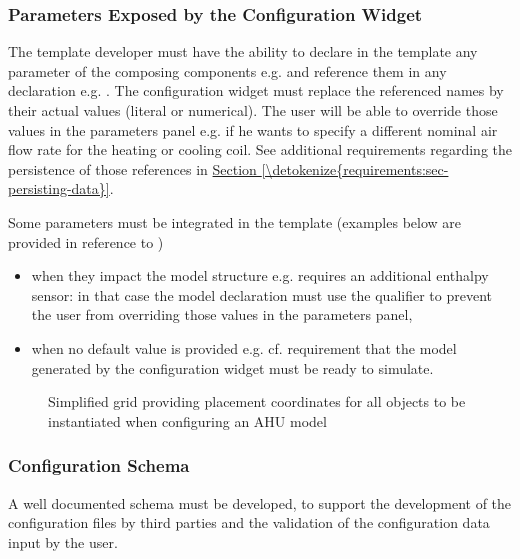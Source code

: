 \documentclass[letterpaper,10pt, openany,english]{sphinxmanual}
\begin{document}
\subsubsection{Parameters Exposed by the Configuration Widget}
\label{\detokenize{requirements:parameters-exposed-by-the-configuration-widget}}
The template developer must have the ability to declare in the template any parameter of the composing components e.g.  and reference them in any declaration e.g. . The configuration widget must replace the referenced names by their actual values (literal or numerical). The user will be able to override those values in the parameters panel e.g. if he wants to specify a different nominal air flow rate for the heating or cooling coil. See additional requirements regarding the persistence of those references in \hyperref[\detokenize{requirements:sec-persisting-data}]{Section \ref{\detokenize{requirements:sec-persisting-data}}}.

Some parameters must be integrated in the template (examples below are provided in reference to )
\begin{itemize}
\item {} 
when they impact the model structure e.g.  requires an additional enthalpy sensor: in that case the model declaration must use the  qualifier to prevent the user from overriding those values in the parameters panel,

\item {} 
when no default value is provided e.g.  cf. requirement that the model generated by the configuration widget must be ready to simulate.

\end{itemize}

\begin{figure}[htbp]
\centering
\capstart

\noindent{}
\caption{Simplified grid providing placement coordinates for all objects to be instantiated when configuring an AHU model}\label{\detokenize{requirements:grid}}\end{figure}


\subsubsection{Configuration Schema}
\label{\detokenize{requirements:configuration-schema}}
A well documented schema must be developed, to support the development of the configuration files by third parties and the validation of the configuration data input by the user.
\end{document}
